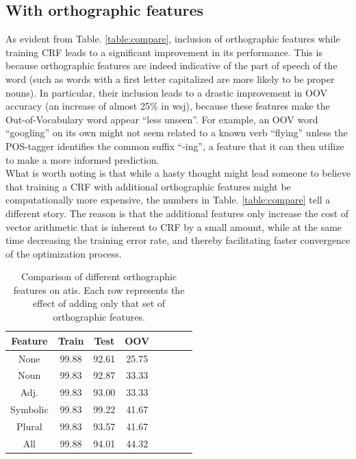 \documentclass{sig-alternate-05-2015}
\begin{document}
\subsection{With orthographic features}
As evident from Table. \ref{table:compare}, inclusion of orthographic features while training CRF leads to a significant improvement in its performance. This is because orthographic features are indeed indicative of the part of speech of the word (such as words with a first letter capitalized are more likely to be proper nouns). In particular, their inclusion leads to a drastic improvement in OOV accuracy (an increase of almost 25\% in wsj), because these features make the Out-of-Vocabulary word appear ``less unseen''. For example, an OOV word ``googling'' on its own might not seem related to a known verb ``flying'' unless the POS-tagger identifies the common suffix ``-ing'', a feature that it can then utilize to make a more informed prediction.\\
What is worth noting is that while a hasty thought might lead someone to believe that training a CRF with additional orthographic features might be computationally more expensive, the numbers in Table. \ref{table:compare} tell a different story. The reason is that the additional features only increase the cost of vector arithmetic that is inherent to CRF by a small amount, while at the same time decreasing the training error rate, and thereby facilitating faster convergence of the optimization process.

\begin{table}[ht]
\centering
  \begin{tabular}{|c|c|c|c|c|c|c|c|}
	\hline 
      {\bf Feature} & {\bf Train} & {\bf Test} & {\bf OOV}\\
      \hline
      None & 99.88 & 92.61 & 25.75 \\
      Noun & 99.83 & 92.87 & 33.33 \\
      Adj. & 99.83 & 93.00 & 33.33 \\
      Symbolic & 99.83 & 99.22 & 41.67 \\
      Plural & 99.83 & 93.57 & 41.67\\
      All & 99.88 & 94.01 & 44.32 \\
  \hline
  \end{tabular}
\caption{Comparison of different orthographic features on atis. Each row represents the effect of adding only that set of orthographic features.}
\label{table:single-ortho-atis}
\end{table}
\end{document}
